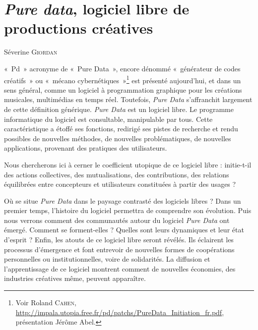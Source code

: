 \documentclass{FramateX}
\begin{document}
\chapter*{\textit{Pure data}, logiciel libre de productions créatives}
{}

\begin{refsection}

\begin{flushright}
Séverine \textsc{Giordan}
\end{flushright}
\vspace{10 mm}


«~Pd~» acronyme de «~Pure Data~», encore dénommé «~générateur de codes
créatifs~» ou «~mécano cybernétiques~»\footnote{Voir Roland \textsc{Cahen}, \url{http://impala.utopia.free.fr/pd/patchs/PureData_Initiation_fr.pdf},
présentation Jérôme Abel.} est présenté aujourd'hui, et dans un sens
général, comme un logiciel à programmation graphique pour les créations
musicales, multimédias en temps réel. Toutefois, \textit{Pure Data} s'affranchit
largement de cette définition générique. \textit{Pure Data} est un logiciel
libre. Le programme informatique du logiciel est consultable,
manipulable par tous. Cette caractéristique a étoffé ses fonctions,
redirigé ses pistes de recherche et rendu possibles de nouvelles
méthodes, de nouvelles problématiques, de nouvelles applications,
provenant des pratiques des utilisateurs.

Nous chercherons ici à cerner le coefficient utopique de ce logiciel
libre : initie-t-il des actions collectives, des mutualisations, des
contributions, des relations équilibrées entre concepteurs et
utilisateurs constituées à partir des usages ?

Où se situe \textit{Pure Data} dans le paysage contrasté des logiciels libres ?
Dans un premier temps, l'histoire du logiciel
permettra de comprendre son évolution. Puis nous verrons comment des
communautés autour du logiciel \textit{Pure Data} ont émergé. Comment se
forment-elles ? Quelles sont leurs dynamiques et leur état
d'esprit ? Enfin, les atouts de ce logiciel libre
seront révélés. Ils éclairent les processus d'émergence et font
entrevoir de nouvelles formes de coopérations personnelles ou
institutionnelles, voire de solidarités. La diffusion et
l'apprentissage de ce logiciel montrent comment de nouvelles économies,
des industries créatives même, peuvent apparaître.


\end{refsection}
\end{document}
